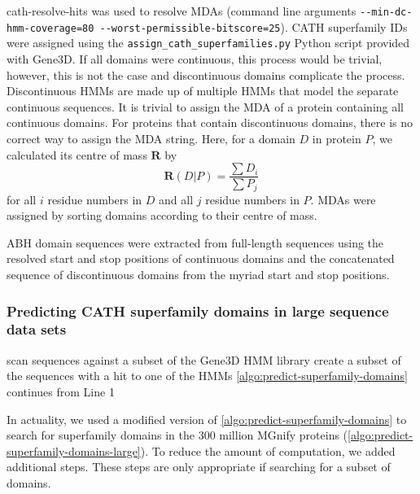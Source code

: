 cath-resolve-hits was used to resolve MDAs (command line arguments \texttt{-\/-min-dc-hmm-coverage=80\ -\/-worst-permissible-bitscore=25}). CATH superfamily IDs were assigned using the \texttt{assign\_cath\_superfamilies.py} Python script provided with Gene$3$D. If all domains were continuous, this process would be trivial, however, this is not the case and discontinuous domains complicate the process. Discontinuous HMMs are made up of multiple HMMs that model the separate continuous sequences. It is trivial to assign the MDA of a protein containing all continuous domains. For proteins that contain discontinuous domains, there is no correct way to assign the MDA string. Here, for a domain $D$ in protein $P$, we calculated its centre of mass $\mathbf{R}$ by
\[ \mathbf{R}(D|P) = \frac{\sum D_i}{\sum P_j} \]
for all $i$ residue numbers in $D$ and all $j$ residue numbers in $P$. MDAs were assigned by sorting domains according to their centre of mass.

ABH domain sequences were extracted from full-length sequences using the resolved start and stop positions of continuous domains and the concatenated sequence of discontinuous domains from the myriad start and stop positions.

\subsubsection{Predicting CATH superfamily domains in large sequence data sets}
\label{sec:find_superfamily_domains_in_large_dbs}

\begin{algorithm}[hbt!]
    \caption{%
        Predict CATH superfamily domains in large sequence data sets.
    }
    \label{algo:predict-superfamily-domains-large}
    \begin{algorithmic}[1]
        \Procedure{}{}
        \State scan sequences against a subset of the Gene$3$D HMM library
        \State create a subset of the sequences with a hit to one of the HMMs
        \State \ref{algo:predict-superfamily-domains} continues from Line 1
        \EndProcedure
    \end{algorithmic}
\end{algorithm}

In actuality, we used a modified version of \ref{algo:predict-superfamily-domains} to search for superfamily domains in the $300$ million MGnify proteins (\ref{algo:predict-superfamily-domains-large}). To reduce the amount of computation, we added additional steps. These steps are only appropriate if searching for a subset of domains.

